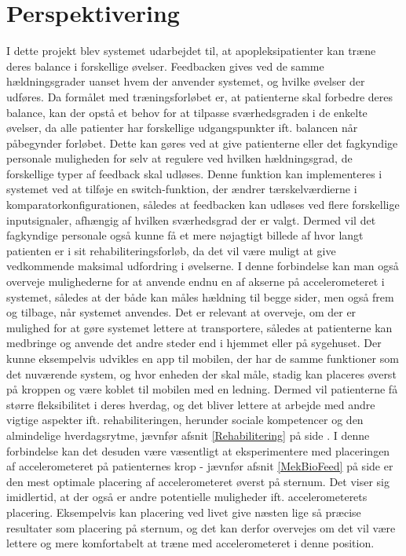 \section{Perspektivering}
I dette projekt blev systemet udarbejdet til, at apopleksipatienter kan træne deres balance i forskellige øvelser. Feedbacken gives ved de samme hældningsgrader uanset hvem der anvender systemet, og hvilke øvelser der udføres. Da formålet med træningsforløbet er, at patienterne skal forbedre deres balance, kan der opstå et behov for at tilpasse sværhedsgraden i de enkelte øvelser, da alle patienter har forskellige udgangspunkter ift. balancen når påbegynder forløbet. Dette kan gøres ved at give patienterne eller det fagkyndige personale muligheden for selv at regulere ved hvilken hældningsgrad, de forskellige typer af feedback skal udløses. Denne funktion kan implementeres i systemet ved at tilføje en switch-funktion, der ændrer tærskelværdierne i komparatorkonfigurationen, således at feedbacken kan udløses ved flere forskellige inputsignaler, afhængig af hvilken sværhedsgrad der er valgt. Dermed vil det fagkyndige personale også kunne få et mere nøjagtigt billede af hvor langt patienten er i sit rehabiliteringsforløb, da det vil være muligt at give vedkommende maksimal udfordring i øvelserne. I denne forbindelse kan man også overveje mulighederne for at anvende endnu en af akserne på accelerometeret i systemet, således at der både kan måles hældning til begge sider, men også frem og tilbage, når systemet anvendes.
Det er relevant at overveje, om der er mulighed for at gøre systemet lettere at transportere, således at patienterne kan medbringe og anvende det andre steder end i hjemmet eller på sygehuset. Der kunne eksempelvis udvikles en app til mobilen, der har de samme funktioner som det nuværende system, og hvor enheden der skal måle, stadig kan placeres øverst på kroppen og være koblet til mobilen med en ledning. Dermed vil patienterne få større fleksibilitet i deres hverdag, og det bliver lettere at arbejde med andre vigtige aspekter ift. rehabiliteringen, herunder sociale kompetencer og den almindelige hverdagsrytme, jævnfør afsnit \ref{Rehabilitering} på side \pageref{Rehabilitering}. I denne forbindelse kan det desuden være væsentligt at eksperimentere med placeringen af accelerometeret på patienternes krop - jævnfør afsnit \ref{MekBioFeed} på side \pageref{MekBioFeed} er den mest optimale placering af accelerometeret øverst på sternum. Det viser sig imidlertid, at der også er andre potentielle muligheder ift. accelerometerets placering. Eksempelvis kan placering ved livet give næsten lige så præcise resultater som placering på sternum, og det kan derfor overvejes om det vil være lettere og mere komfortabelt at træne med accelerometeret i denne position\cite{Gjoreski2011}.\\
